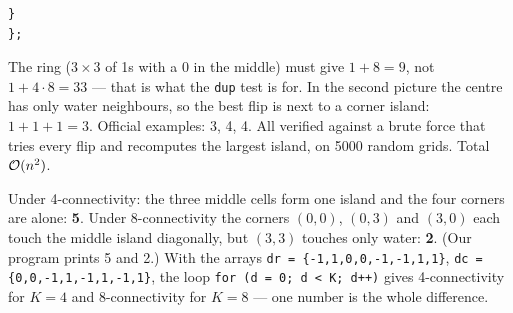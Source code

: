 \begin{solutionbox}
\begin{lstlisting}[style=cpp]
    }
};
\end{lstlisting}
\begin{center}
\end{center}
The ring ($3\times3$ of 1s with a 0 in the middle) must give $1 + 8 = 9$, not $1 + 4\cdot8 = 33$ --- that is what the \texttt{dup} test is for. In the second picture the centre has only water neighbours, so the best flip is next to a corner island: $1+1+1 = 3$. Official examples: 3, 4, 4. All verified against a brute force that tries every flip and recomputes the largest island, on 5000 random grids. Total $\mathcal{O}(n^2)$.
\end{solutionbox}

\begin{solutionbox}
\begin{center}
\end{center}
Under 4-connectivity: the three middle cells form one island and the four corners are alone: \textbf{5}. Under 8-connectivity the corners $(0,0)$, $(0,3)$ and $(3,0)$ each touch the middle island diagonally, but $(3,3)$ touches only water: \textbf{2}. (Our program prints 5 and 2.) With the arrays
\texttt{dr = \{-1,1,0,0,-1,-1,1,1\}}, \texttt{dc = \{0,0,-1,1,-1,1,-1,1\}}, the loop \texttt{for (d = 0; d < K; d++)} gives 4-connectivity for $K = 4$ and 8-connectivity for $K = 8$ --- one number is the whole difference.
\end{solutionbox}

